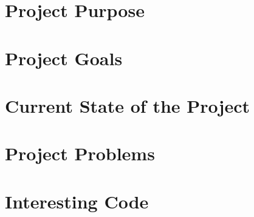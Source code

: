 \documentclass[onecolumn, draftclsnofoot,10pt, compsoc]{IEEEtran}
\def \CapstoneProjectName{ISS Barometer App }
\begin{document}
\begin{titlepage}
\begin{singlespace}
{{            }
            \vspace{20pt}
        }
        \begin{abstract}
        The International Space Station, the conglomerate work of multiple national space associations, including NASA, requires precision devices to monitor the many aspects of space life.
        One very important aspect for the success of life in near vacuum is sustained air pressure inside the modules.
        This air pressure is monitored by mechanical barometers, called Manovacometers, which must be visually monitored, and are no longer available.
        The \CapstoneProjectName seeks to provide a suitable replacement for the current barometer device aboard the International Space Station.
        This document will serve to introduce the \CapstoneProjectName, and will detail the problem, the solution, and the success metrics of the project.
        The sections include the Definition of the Problem, Definition of Project, and the Metrics of Success.
        \end{abstract}
    \end{singlespace}
\end{titlepage}
\newpage
{}
\tableofcontents
\clearpage

\section{Project Purpose}

\section{Project Goals}

\section{Current State of the Project}

\section{Project Problems}

\section{Interesting Code}
\end{document}
